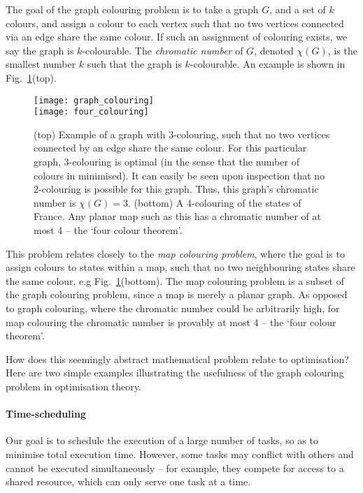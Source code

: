 The goal of the graph colouring problem is to take a graph $G$, and a set of $k$ colours, and assign a colour to each vertex such that no two vertices connected via an edge share the same colour. If such an assignment of colouring exists, we say the graph is $k$-colourable. The \textit{chromatic number} of $G$, denoted \mbox{$\chi(G)$}, is the smallest number $k$ such that the graph is $k$-colourable. An example is shown in Fig.~\ref{fig:graph_colouring}(top).

\begin{figure}[htpb]
\texttt{[image: graph\_colouring]}\\
\texttt{[image: four\_colouring]}
\caption{(top) Example of a graph with 3-colouring, such that no two vertices connected by an edge share the same colour. For this particular graph, 3-colouring is optimal (in the sense that the number of colours in minimised). It can easily be seen upon inspection that no 2-colouring is possible for this graph. Thus, this graph's chromatic number is \mbox{$\chi(G)=3$}. (bottom) A 4-colouring of the states of France. Any planar map such as this has a chromatic number of at most 4 -- the `four colour theorem'.}\label{fig:graph_colouring}	
\end{figure}

This problem relates closely to the \textit{map colouring problem}, where the goal is to assign colours to states within a map, such that no two neighbouring states share the same colour, e.g Fig.~\ref{fig:graph_colouring}(bottom). The map colouring problem is a subset of the graph colouring problem, since a map is merely a planar graph. As opposed to graph colouring, where the chromatic number could be arbitrarily high, for map colouring the chromatic number is provably at most 4 -- the `four colour theorem'.

How does this seemingly abstract mathematical problem relate to optimisation? Here are two simple examples illustrating the usefulness of the graph colouring problem in optimisation theory.

\paragraph{Time-scheduling}

Our goal is to schedule the execution of a large number of tasks, so as to minimise total execution time. However, some tasks may conflict with others and cannot be executed simultaneously -- for example, they compete for access to a shared resource, which can only serve one task at a time.

